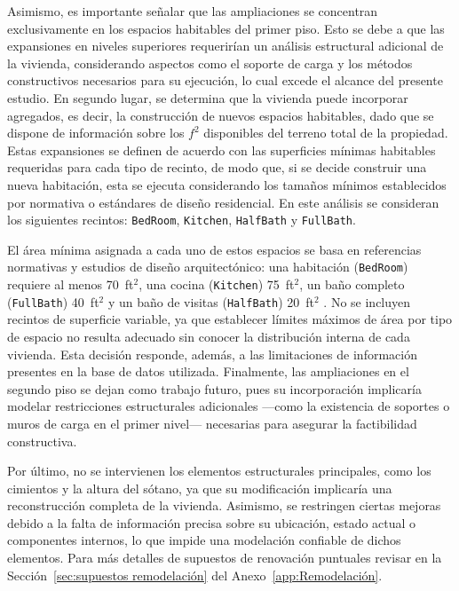 Asimismo, es importante señalar que las ampliaciones se concentran exclusivamente en los espacios habitables del primer piso. Esto se debe a que las expansiones en niveles superiores requerirían un análisis estructural adicional de la vivienda, considerando aspectos como el soporte de carga y los métodos constructivos necesarios para su ejecución, lo cual excede el alcance del presente estudio. En segundo lugar, se determina que la vivienda puede incorporar agregados, es decir, la construcción de nuevos espacios habitables, dado que se dispone de información sobre los $f^{2}$ disponibles del terreno total de la propiedad. Estas expansiones se definen de acuerdo con las superficies mínimas habitables requeridas para cada tipo de recinto, de modo que, si se decide construir una nueva habitación, esta se ejecuta considerando los tamaños mínimos establecidos por normativa o estándares de diseño residencial. En este análisis se consideran los siguientes recintos: \texttt{BedRoom}, \texttt{Kitchen}, \texttt{HalfBath} y \texttt{FullBath}.

El área mínima asignada a cada uno de estos espacios se basa en referencias normativas y estudios de diseño arquitectónico: una habitación (\texttt{BedRoom}) requiere al menos 70~ft$^{2}$, una cocina (\texttt{Kitchen}) 75~ft$^{2}$, un baño completo (\texttt{FullBath}) 40~ft$^{2}$ y un baño de visitas (\texttt{HalfBath}) 20~ft$^{2}$ \cite{InternationalResidentialCode2021}. No se incluyen recintos de superficie variable, ya que establecer límites máximos de área por tipo de espacio no resulta adecuado sin conocer la distribución interna de cada vivienda. Esta decisión responde, además, a las limitaciones de información presentes en la base de datos utilizada. Finalmente, las ampliaciones en el segundo piso se dejan como trabajo futuro, pues su incorporación implicaría modelar restricciones estructurales adicionales —como la existencia de soportes o muros de carga en el primer nivel— necesarias para asegurar la factibilidad constructiva.

Por último, no se intervienen los elementos estructurales principales, como los cimientos y la altura del sótano, ya que su modificación implicaría una reconstrucción completa de la vivienda. Asimismo, se restringen ciertas mejoras debido a la falta de información precisa sobre su ubicación, estado actual o componentes internos, lo que impide una modelación confiable de dichos elementos. Para más detalles de supuestos de renovación puntuales revisar en la Sección~\ref{sec:supuestos remodelación} del Anexo~\ref{app:Remodelación}.

